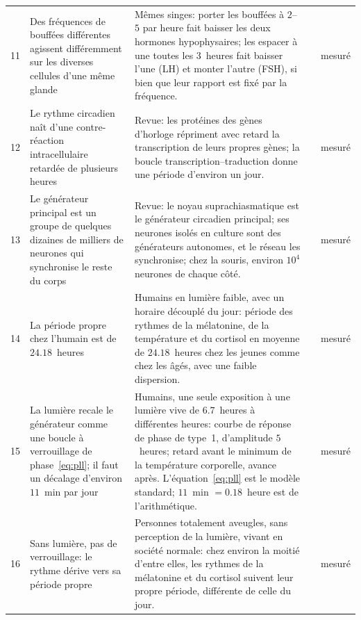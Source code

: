 {\begin{longtable}{>{\raggedright}p{0.5cm}>{\raggedright}p{4.0cm}>{\raggedright}p{5.6cm}>{\raggedright}p{2.3cm}>{\raggedright\arraybackslash}p{1.7cm}}
11 & Des fréquences de bouffées différentes agissent différemment sur les diverses cellules d'une même glande & Mêmes singes: porter les bouffées à $2$--$5$ par heure fait baisser les deux hormones hypophysaires; les espacer à une toutes les $3$~heures fait baisser l'une (LH) et monter l'autre (FSH), si bien que leur rapport est fixé par la fréquence. & \cite{Wildt1981gnrh} & mesuré \\
12 & Le rythme circadien naît d'une contre-réaction intracellulaire retardée de plusieurs heures & Revue: les protéines des gènes d'horloge répriment avec retard la transcription de leurs propres gènes; la boucle transcription--traduction donne une période d'environ un jour. & \cite{TakahashiJS2017} & mesuré \\
13 & Le générateur principal est un groupe de quelques dizaines de milliers de neurones qui synchronise le reste du corps & Revue: le noyau suprachiasmatique est le générateur circadien principal; ses neurones isolés en culture sont des générateurs autonomes, et le réseau les synchronise; chez la souris, environ $10^4$ neurones de chaque côté. & \cite{Welsh2010scn} & mesuré \\
14 & La période propre chez l'humain est de $24.18$~heures & Humains en lumière faible, avec un horaire découplé du jour: période des rythmes de la mélatonine, de la température et du cortisol en moyenne de $24.18$~heures chez les jeunes comme chez les âgés, avec une faible dispersion. & \cite{Czeisler1999} & mesuré \\
15 & La lumière recale le générateur comme une boucle à verrouillage de phase~\eqref{eq:pll}; il faut un décalage d'environ $11$~min par jour & Humains, une seule exposition à une lumière vive de $6.7$~heures à différentes heures: courbe de réponse de phase de type~1, d'amplitude $5$~heures; retard avant le minimum de la température corporelle, avance après. L'équation~\eqref{eq:pll} est le modèle standard; $11$~min $=0.18$~heure est de l'arithmétique. & \cite{Khalsa2003prc} & mesuré \\
16 & Sans lumière, pas de verrouillage: le rythme dérive vers sa période propre & Personnes totalement aveugles, sans perception de la lumière, vivant en société normale: chez environ la moitié d'entre elles, les rythmes de la mélatonine et du cortisol suivent leur propre période, différente de celle du jour. & \cite{Sack1992blind} & mesuré \\
\bottomrule
\end{longtable}}
